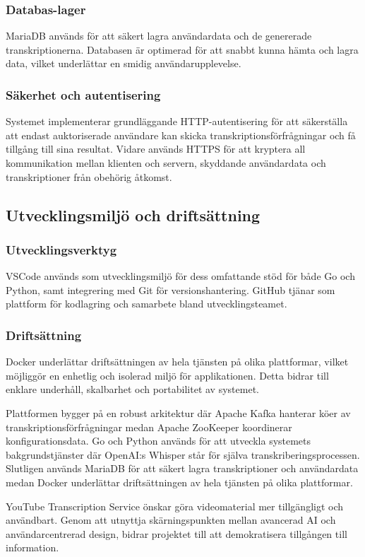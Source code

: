\subsubsection{Databas-lager}
MariaDB används för att säkert lagra användardata och de genererade
transkriptionerna. Databasen är optimerad för att snabbt kunna hämta och
lagra data, vilket underlättar en smidig användarupplevelse.

\subsubsection{Säkerhet och autentisering}
Systemet implementerar grundläggande HTTP-autentisering för att säkerställa
att endast auktoriserade användare kan skicka transkriptionsförfrågningar och
få tillgång till sina resultat. Vidare används HTTPS för att kryptera all
kommunikation mellan klienten och servern, skyddande användardata och
transkriptioner från obehörig åtkomst.

\subsection{Utvecklingsmiljö och driftsättning}

\subsubsection{Utvecklingsverktyg}
VSCode används som utvecklingsmiljö för dess omfattande
stöd för både Go och Python, samt integrering med Git för versionshantering.
GitHub tjänar som plattform för kodlagring och samarbete bland
utvecklingsteamet.

\subsubsection{Driftsättning}
Docker underlättar driftsättningen av hela tjänsten på olika
plattformar, vilket möjliggör en enhetlig och isolerad miljö för
applikationen. Detta bidrar till enklare underhåll, skalbarhet och
portabilitet av systemet.

Plattformen bygger på en robust arkitektur där Apache Kafka hanterar köer av
transkriptionsförfrågningar medan Apache ZooKeeper koordinerar
konfigurationsdata. Go och Python används för att utveckla systemets
bakgrundstjänster där OpenAI:s Whisper står för själva
transkriberingsprocessen. Slutligen används MariaDB för att säkert lagra
transkriptioner och användardata medan Docker underlättar driftsättningen av
hela tjänsten på olika plattformar.

YouTube Transcription Service önskar göra videomaterial mer tillgängligt och
användbart. Genom att utnyttja skärningspunkten mellan avancerad AI och
användarcentrerad design, bidrar projektet till att demokratisera tillgången
till information.

